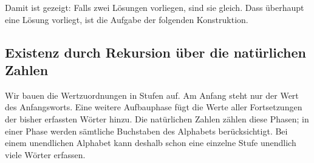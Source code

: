 \begin{tabproofwide}
\end{tabproofwide}

Damit ist gezeigt: Falls zwei Lösungen vorliegen, sind sie gleich.
Dass überhaupt eine Lösung vorliegt, ist die Aufgabe der folgenden
Konstruktion.

\subsection{Existenz durch Rekursion über die natürlichen Zahlen}

Wir bauen die Wertzuordnungen in Stufen auf. Am Anfang steht nur der
Wert des Anfangsworts. Eine weitere Aufbauphase fügt die Werte aller
Fortsetzungen der bisher erfassten Wörter hinzu. Die natürlichen Zahlen
zählen diese Phasen; in einer Phase werden sämtliche Buchstaben des
Alphabets berücksichtigt. Bei einem unendlichen Alphabet kann deshalb
schon eine einzelne Stufe unendlich viele Wörter erfassen.

